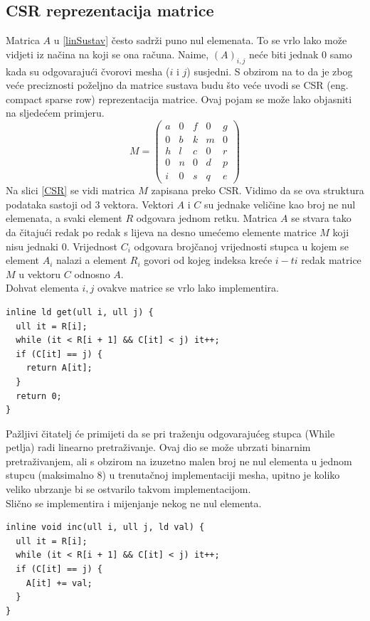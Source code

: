 \documentclass[zavrsnirad]{../fer}
\begin{document}
\subsection{CSR reprezentacija matrice}
Matrica $A$ u \ref{linSustav} 
često sadrži puno nul elemenata. To se vrlo lako može 
vidjeti iz načina na koji se ona računa. Naime, $(A)_{i,j}$ 
neće biti jednak $0$ samo kada su odgovarajući čvorovi 
mesha ($i$ i $j$) susjedni. S obzirom na to da je 
zbog veće preciznosti poželjno da
matrice sustava budu što veće uvodi se CSR (eng. compact sparse row)
reprezentacija matrice. Ovaj pojam se može lako objasniti na
sljedećem primjeru.
$$M = \begin{pmatrix}
  a & 0 & f & 0 & g\\ 
  0 & b & k & m & 0\\ 
  h & l & c & 0 & r\\ 
  0 & n & 0 & d & p\\ 
  i & 0 & s & q & e
\end{pmatrix}$$
Na slici \ref{CSR} 
se vidi matrica $M$ zapisana preko CSR. Vidimo da se
ova struktura podataka sastoji od 3 vektora. 
Vektori $A$ i $C$ su jednake veličine kao broj ne nul 
elemenata, a svaki element $R$ odgovara jednom retku.
Matrica $A$ se stvara tako da čitajući redak po redak
s lijeva na desno umećemo elemente matrice $M$ koji 
nisu jednaki $0$. Vrijednost $C_i$ odgovara brojčanoj
vrijednosti stupca u kojem se element $A_i$ nalazi 
a element $R_i$ govori od kojeg indeksa kreće $i-ti$
redak matrice $M$ u vektoru $C$ odnosno $A$. 
\\ 
\bigskip
Dohvat elementa $i,j$ ovakve matrice se vrlo lako implementira.
\begin{verbatim}
inline ld get(ull i, ull j) {
  ull it = R[i];
  while (it < R[i + 1] && C[it] < j) it++;
  if (C[it] == j) {
    return A[it];
  }
  return 0;
}
\end{verbatim}
Pažljivi čitatelj će primijeti da se pri traženju odgovarajućeg
stupca (While petlja) radi linearno pretraživanje. Ovaj dio 
se može ubrzati binarnim pretraživanjem, ali s obzirom na 
izuzetno malen broj ne nul elementa u jednom stupcu (maksimalno $8$)
u trenutačnoj implementaciji mesha, upitno je koliko veliko ubrzanje 
bi se ostvarilo takvom implementacijom.
\\ 
\bigskip
Slično se implementira i mijenjanje nekog ne nul elementa.
\begin{verbatim}
inline void inc(ull i, ull j, ld val) {
  ull it = R[i];
  while (it < R[i + 1] && C[it] < j) it++;
  if (C[it] == j) {
    A[it] += val;
  }
}
\end{verbatim}
\end{document}
